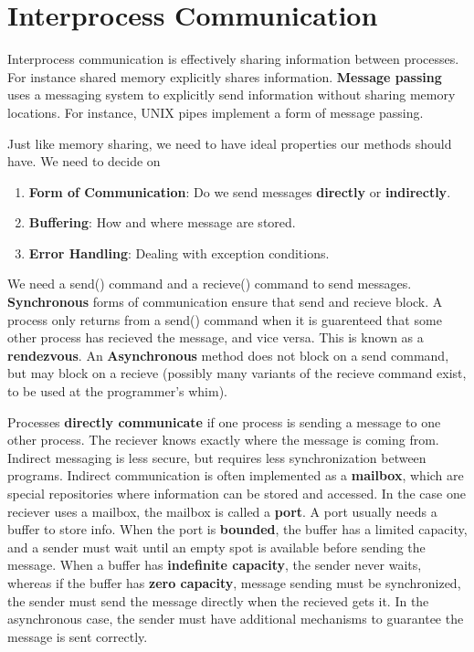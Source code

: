 \chapter{Interprocess Communication}

Interprocess communication is effectively sharing information between processes. For instance shared memory explicitly shares information. {\bf Message passing} uses a messaging system to explicitly send information without sharing memory locations. For instance, UNIX pipes implement a form of message passing.

Just like memory sharing, we need to have ideal properties our methods should have. We need to decide on
%
\begin{enumerate}
    \item {\bf Form of Communication}: Do we send messages {\bf directly} or {\bf indirectly}.
    \item {\bf Buffering}: How and where message are stored.
    \item {\bf Error Handling}: Dealing with exception conditions.
\end{enumerate}
%
We need a send() command and a recieve() command to send messages. {\bf Synchronous} forms of communication ensure that send and recieve block. A process only returns from a send() command when it is guarenteed that some other process has recieved the message, and vice versa. This is known as a {\bf rendezvous}. An {\bf Asynchronous} method does not block on a send command, but may block on a recieve (possibly many variants of the recieve command exist, to be used at the programmer's whim).

Processes {\bf directly communicate} if one process is sending a message to one other process. The reciever knows exactly where the message is coming from. Indirect messaging is less secure, but requires less synchronization between programs. Indirect communication is often implemented as a {\bf mailbox}, which are special repositories where information can be stored and accessed. In the case one reciever uses a mailbox, the mailbox is called a {\bf port}. A port usually needs a buffer to store info. When the port is {\bf bounded}, the buffer has a limited capacity, and a sender must wait until an empty spot is available before sending the message. When a buffer has {\bf indefinite capacity}, the sender never waits, whereas if the buffer has {\bf zero capacity}, message sending must be synchronized, the sender must send the message directly when the recieved gets it. In the asynchronous case, the sender must have additional mechanisms to guarantee the message is sent correctly.

